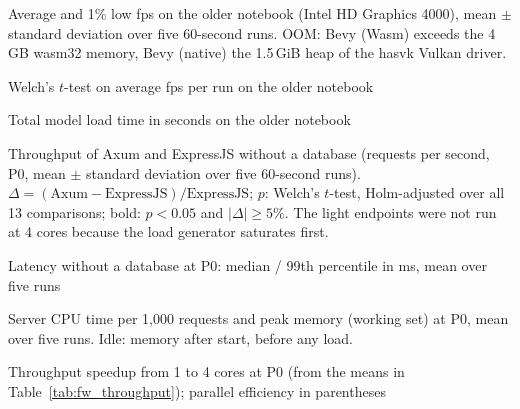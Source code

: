 \documentclass[journal]{IEEEtran}
\begin{document}
\begin{table}[!t]
\centering
\caption{Average and 1\% low fps on the older notebook (Intel HD Graphics 4000), mean $\pm$ standard deviation over five 60-second runs. OOM: Bevy (Wasm) exceeds the 4\,GB wasm32 memory, Bevy (native) the 1.5\,GiB heap of the hasvk Vulkan driver.}
\label{tab:fps_asus}
\resizebox{\textwidth}{!}{}
\end{table}

\begin{table}[!t]
\centering
\caption{Welch's $t$-test on average fps per run on the older notebook}
\label{tab:ttest_asus}
\resizebox{\columnwidth}{!}{}
\end{table}

\begin{table}[!t]
\centering
\caption{Total model load time in seconds on the older notebook}
\label{tab:load_asus}
\resizebox{\columnwidth}{!}{}
\end{table}

\begin{table}[!t]
\centering
\caption{Throughput of Axum and ExpressJS without a database (requests per second, P0, mean $\pm$ standard deviation over five 60-second runs). $\Delta = (\text{Axum} - \text{ExpressJS})/\text{ExpressJS}$; $p$: Welch's $t$-test, Holm-adjusted over all 13 comparisons; bold: $p < 0.05$ and $|\Delta| \geq 5\%$. The light endpoints were not run at 4 cores because the load generator saturates first.}
\label{tab:fw_throughput}

\end{table}

\begin{table}[!t]
\centering
\caption{Latency without a database at P0: median / 99th percentile in ms, mean over five runs}
\label{tab:fw_latency}
\resizebox{\columnwidth}{!}{}
\end{table}

\begin{table}[!t]
\centering
\caption{Server CPU time per 1{,}000 requests and peak memory (working set) at P0, mean over five runs. Idle: memory after start, before any load.}
\label{tab:fw_resources}

\end{table}

\begin{table}[!t]
\centering
\caption{Throughput speedup from 1 to 4 cores at P0 (from the means in Table~\ref{tab:fw_throughput}); parallel efficiency in parentheses}
\label{tab:fw_scaling}

\end{table}
\end{document}
